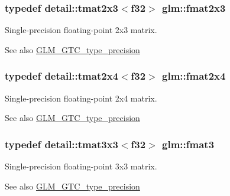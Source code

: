 \subsubsection[{fmat2x3}]{\setlength{\rightskip}{0pt plus 5cm}typedef detail\+::tmat2x3$<$f32$>$ {\bf glm\+::fmat2x3}}\label{group__gtc__type__precision_ga962841878f2520a9ac2859bc2bd467fb}
Single-\/precision floating-\/point 2x3 matrix. \begin{DoxySeeAlso}{See also}
\hyperlink{group__gtc__type__precision}{G\+L\+M\+\_\+\+G\+T\+C\+\_\+type\+\_\+precision} 
\end{DoxySeeAlso}
\hypertarget{group__gtc__type__precision_gaf838bceea05a5b2fe2ea7bbb7d582b1a}{}
\subsubsection[{fmat2x4}]{\setlength{\rightskip}{0pt plus 5cm}typedef detail\+::tmat2x4$<$f32$>$ {\bf glm\+::fmat2x4}}\label{group__gtc__type__precision_gaf838bceea05a5b2fe2ea7bbb7d582b1a}
Single-\/precision floating-\/point 2x4 matrix. \begin{DoxySeeAlso}{See also}
\hyperlink{group__gtc__type__precision}{G\+L\+M\+\_\+\+G\+T\+C\+\_\+type\+\_\+precision} 
\end{DoxySeeAlso}
\hypertarget{group__gtc__type__precision_ga97f5385bc271a35cbbff8ac6a420c849}{}
\subsubsection[{fmat3}]{\setlength{\rightskip}{0pt plus 5cm}typedef detail\+::tmat3x3$<$f32$>$ {\bf glm\+::fmat3}}\label{group__gtc__type__precision_ga97f5385bc271a35cbbff8ac6a420c849}
Single-\/precision floating-\/point 3x3 matrix. \begin{DoxySeeAlso}{See also}
\hyperlink{group__gtc__type__precision}{G\+L\+M\+\_\+\+G\+T\+C\+\_\+type\+\_\+precision} 
\end{DoxySeeAlso}
\hypertarget{group__gtc__type__precision_ga8df314d9c425c283d4cec4047b8cf1f6}{}
